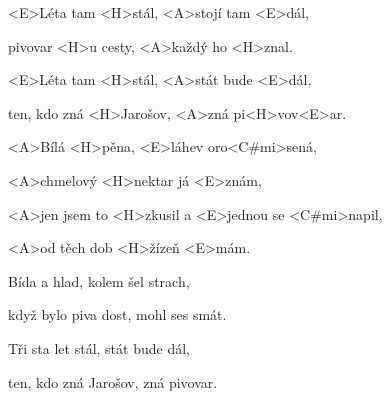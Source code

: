 

\zs
<E>Léta tam <H>stál, <A>stojí tam <E>dál,

pivovar <H>u cesty, <A>každý ho <H>znal.

<E>Léta tam <H>stál, <A>stát bude <E>dál,

ten, kdo zná <H>Jarošov, <A>zná pi<H>vov<E>ar.
\ks

\zr
<A>Bílá <H>pěna, <E>láhev oro<C#mi>sená,

<A>chmelový <H>nektar já <E>znám,

<A>jen jsem to <H>zkusil a <E>jednou se <C#mi>napil,

<A>od těch dob <H>žízeň <E>mám.
\kr

\zs
Bída a hlad, kolem šel strach,

když bylo piva dost, mohl ses smát.

Tři sta let stál, stát bude dál,

ten, kdo zná Jarošov, zná pivovar.
\ks

\zr \kr


\kp


